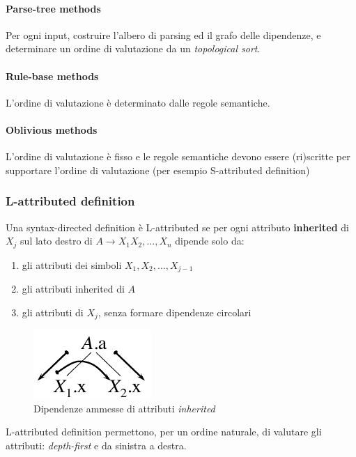 \paragraph{Parse-tree methods}
Per ogni input, costruire l'albero di parsing ed il grafo delle dipendenze, e
determinare un ordine di valutazione da un \textit{topological sort}.
\paragraph{Rule-base methods}
L'ordine di valutazione \`e determinato dalle regole semantiche.
\paragraph{Oblivious methods}
L'ordine di valutazione \`e fisso e le regole semantiche devono essere
(ri)scritte per supportare l'ordine di valutazione (per esempio S-attributed
definition)

\subsubsection{L-attributed definition}
\begin{definition}
Una syntax-directed definition \`e L-attributed se per ogni attributo
\textbf{inherited} di $X_j$ sul lato destro di $A \to X_1X_2,...,X_n$ dipende
solo da:
\begin{enumerate}
\item gli attributi dei simboli $X_1,X_2,...,X_{j-1}$
\item gli attributi inherited di $A$
\item gli attributi di $X_j$, senza formare dipendenze circolari
\end{enumerate}
\end{definition}

\begin{figure}[H]
  \centering
  \includegraphics[scale=0.6]{res/image/possible_dependencies}
  \caption{Dipendenze ammesse di attributi \textit{inherited}}
  \label{img:possible_dependencies}
\end{figure}

L-attributed definition permettono, per un ordine naturale, di valutare gli
attributi: \textit{depth-first} e da sinistra a destra.

